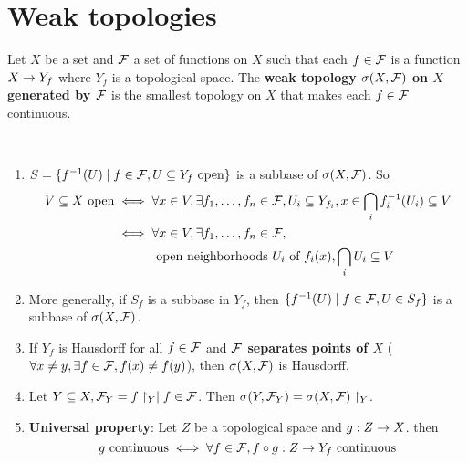\documentclass{article}
\begin{document}
\clearpage

\section{Weak topologies}
Let $X$ be a set and $\mathcal F$ a set of functions on $X$ such that each $f \in \mathcal F$ is a function $X \rightarrow Y_f$ where $Y_f$ is a topological space. The {\bf weak topology $\sigma(X, \mathcal F)$ on $X$ generated by $\mathcal F$} is the smallest topology on $X$ that makes each $f \in \mathcal F$ continuous.

\begin{rmks}~
  \begin{enumerate}
    \item $S = \{f^{-1}(U) \mid f \in \mathcal F, U \subseteq Y_f \text{ open}\}$ is a subbase of $\sigma(X, \mathcal F)$. So
    \begin{align*}
      V \subseteq X \text{ open}
      \iff {} & \forall x \in V, \exists f_1, \dots, f_n \in \mathcal F, U_i \subseteq Y_{f_i}, x \in \bigcap_i f_i^{-1}(U_i) \subseteq V \\
      \iff {} & \forall x \in V, \exists f_1, \dots, f_n \in \mathcal F, \\
      & \text{ open neighborhoods } U_i \text{ of } f_i(x), \bigcap_i U_i \subseteq V
    \end{align*}
    \item More generally, if $S_f$ is a subbase in $Y_f$, then $\{f^{-1}(U) \mid f \in \mathcal F, U \in S_f\}$ is a subbase of $\sigma(X, \mathcal F)$.
    \item If $Y_f$ is Hausdorff for all $f \in \mathcal F$ and {\bf $\mathcal F$ separates points of $X$} ($\forall x \ne y, \exists f \in \mathcal F, f(x) \ne f(y)$), then $\sigma(X, \mathcal F)$ is Hausdorff.
    \item Let $Y \subseteq X, \mathcal F_Y = {f\restriction_Y \mid f \in \mathcal F}$. Then $\sigma(Y, \mathcal F_Y) = \sigma(X, \mathcal F)\restriction_Y$.
    \item {\bf Universal property}: Let $Z$ be a topological space and $g : Z \rightarrow X$. then
    $$g \text{ continuous} \iff \forall f \in \mathcal F, f \circ g : Z \rightarrow Y_f \text{ continuous}$$
  \end{enumerate}
\end{rmks}
\end{document}
